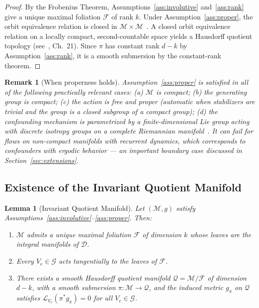 \documentclass[11pt,a4paper]{article}
\newtheorem{lemma}[theorem]{Lemma}
\newtheorem{remark}{Remark}
\newcommand{\cM}{\mathcal{M}}
\newcommand{\cF}{\mathcal{F}}
\newcommand{\cG}{\mathcal{G}}
\newcommand{\cD}{\mathcal{D}}
\newcommand{\cQ}{\mathcal{Q}}
\newcommand{\LP}{\mathcal{L}}
\begin{document}
\begin{proof}
By the Frobenius Theorem, Assumptions~\ref{ass:involutive} and~\ref{ass:rank} give a unique maximal foliation $\cF$ of rank $k$. Under Assumption~\ref{ass:proper}, the orbit equivalence relation is closed in $\cM \times \cM$~\cite{palais1961}. A closed orbit equivalence relation on a locally compact, second-countable space yields a Hausdorff quotient topology (see~\cite{lee2013}, Ch.\ 21). Since $\pi$ has constant rank $d - k$ by Assumption~\ref{ass:rank}, it is a smooth submersion by the constant-rank theorem.
\end{proof}

\begin{remark}[When properness holds]
Assumption~\ref{ass:proper} is satisfied in all of the following practically relevant cases: (a) $\cM$ is compact; (b) the generating group is compact; (c) the action is free and proper (automatic when stabilizers are trivial and the group is a closed subgroup of a compact group); (d) the confounding mechanism is parametrized by a finite-dimensional Lie group acting with discrete isotropy groups on a complete Riemannian manifold~\cite{palais1961}. It can fail for flows on non-compact manifolds with recurrent dynamics, which corresponds to confounders with ergodic behavior — an important boundary case discussed in Section~\ref{sec:extensions}.
\end{remark}

\subsection{Existence of the Invariant Quotient Manifold}

\begin{lemma}[Invariant Quotient Manifold]\label{lem:foliation}
Let $(\cM, g)$ satisfy Assumptions~\ref{ass:involutive}--\ref{ass:proper}. Then:
\begin{enumerate}[label=(\roman*)]
\item $\cM$ admits a unique maximal foliation $\cF$ of dimension $k$ whose leaves are the integral manifolds of $\cD$.
\item Every $V_e \in \cG$ acts tangentially to the leaves of $\cF$.
\item There exists a smooth Hausdorff quotient manifold $\cQ = \cM/\cF$ of dimension $d - k$, with a smooth submersion $\pi: \cM \to \cQ$, and the induced metric $g_\pi$ on $\cQ$ satisfies $\LP_{V_e}(\pi^* g_\pi) = 0$ for all $V_e \in \cG$.
\end{enumerate}
\end{lemma}
\end{document}
